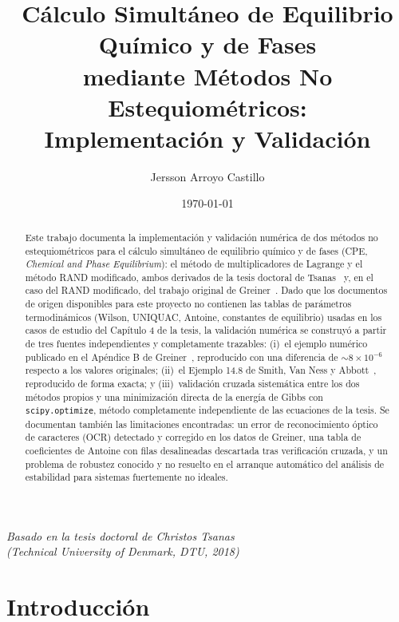 \documentclass[11pt,a4paper]{article}
\title{\textbf{Cálculo Simultáneo de Equilibrio Químico y de Fases\\
mediante Métodos No Estequiométricos:\\
Implementación y Validación}}
\author{Jersson Arroyo Castillo}
\date{\today}
\begin{document}
\maketitle

\begin{center}
\textit{Basado en la tesis doctoral de Christos Tsanas\\
(Technical University of Denmark, DTU, 2018)}
\end{center}

\vspace{1cm}

\begin{abstract}
Este trabajo documenta la implementación y validación numérica de dos
métodos no estequiométricos para el cálculo simultáneo de equilibrio
químico y de fases (CPE, \textit{Chemical and Phase Equilibrium}): el
método de multiplicadores de Lagrange y el método RAND modificado,
ambos derivados de la tesis doctoral de Tsanas~\citep{tsanas2018} y,
en el caso del RAND modificado, del trabajo original de
Greiner~\citep{greiner1991}. Dado que los documentos de origen
disponibles para este proyecto no contienen las tablas de parámetros
termodinámicos (Wilson, UNIQUAC, Antoine, constantes de equilibrio)
usadas en los casos de estudio del Capítulo 4 de la tesis, la
validación numérica se construyó a partir de tres fuentes
independientes y completamente trazables: (i)~el ejemplo numérico
publicado en el Apéndice B de Greiner~\citep{greiner1991}, reproducido
con una diferencia de $\sim 8\times 10^{-6}$ respecto a los valores
originales; (ii)~el Ejemplo 14.8 de Smith, Van Ness y
Abbott~\citep{smithvannessabbott}, reproducido de forma exacta; y
(iii)~validación cruzada sistemática entre los dos métodos propios y
una minimización directa de la energía de Gibbs con
\texttt{scipy.optimize}, método completamente independiente de las
ecuaciones de la tesis. Se documentan también las limitaciones
encontradas: un error de reconocimiento óptico de caracteres (OCR)
detectado y corregido en los datos de Greiner, una tabla de
coeficientes de Antoine con filas desalineadas descartada tras
verificación cruzada, y un problema de robustez conocido y no resuelto
en el arranque automático del análisis de estabilidad para sistemas
fuertemente no ideales.
\end{abstract}

\tableofcontents

\section{Introducción}
\end{document}
